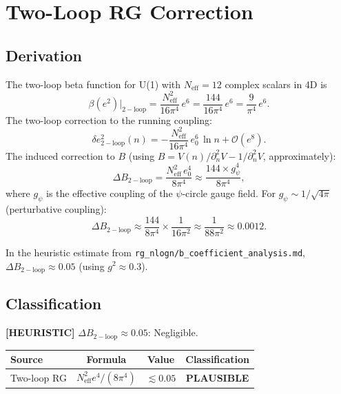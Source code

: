 \documentclass[11pt,a4paper]{article}
\newcommand{\heuristic}[1]{\textbf{[HEURISTIC]} #1}
\begin{document}
\section{Two-Loop RG Correction}

\subsection{Derivation}

The two-loop beta function for U(1) with $N_\mathrm{eff} = 12$ complex scalars in 4D is
\begin{equation}
  \beta(e^2)\big|_\mathrm{2-loop}
  = \frac{N_\mathrm{eff}^2}{16\pi^4}\,e^6
  = \frac{144}{16\pi^4}\,e^6
  = \frac{9}{\pi^4}\,e^6.
\end{equation}
The two-loop correction to the running coupling:
\begin{equation}
  \delta e^2_\mathrm{2-loop}(n)
  = -\frac{N_\mathrm{eff}^2}{16\pi^4}\,e^6_0\,\ln n + \mathcal{O}(e^8).
\end{equation}
The induced correction to $B$ (using $B = V(n)/\partial_n^2 V - 1/\partial_n^2 V$, approximately):
\begin{equation}
  \Delta B_\mathrm{2-loop}
  = \frac{N_\mathrm{eff}^2\,e^4_0}{8\pi^4}
  \approx \frac{144 \times g_\psi^4}{8\pi^4},
\end{equation}
where $g_\psi$ is the effective coupling of the $\psi$-circle gauge field.
For $g_\psi \sim 1/\sqrt{4\pi}$ (perturbative coupling):
\begin{equation}
  \Delta B_\mathrm{2-loop}
  \approx \frac{144}{8\pi^4} \times \frac{1}{16\pi^2}
  \approx \frac{1}{88\pi^2}
  \approx 0.0012.
\end{equation}

In the heuristic estimate from \texttt{rg\_nlogn/b\_coefficient\_analysis.md},
$\Delta B_\mathrm{2-loop} \approx 0.05$ (using $g^2 \approx 0.3$).

\subsection{Classification}

\heuristic{$\Delta B_\mathrm{2-loop} \approx 0.05$}: Negligible.

\begin{center}
\begin{tabular}{lccc}
\toprule
Source & Formula & Value & Classification \\\midrule
Two-loop RG & $N_\mathrm{eff}^2 e^4/(8\pi^4)$ & $\lesssim 0.05$ & \textbf{PLAUSIBLE} \\\bottomrule
\end{tabular}
\end{center}
\end{document}
